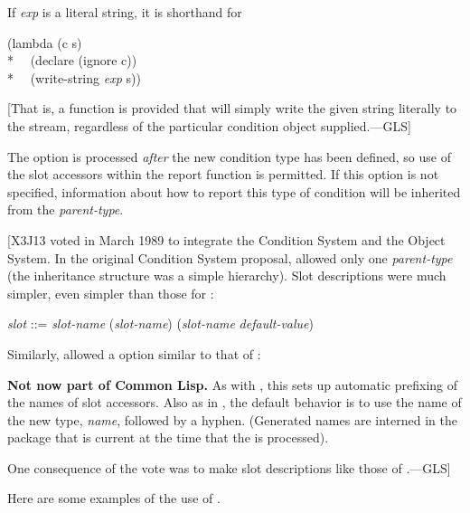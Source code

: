 \begin{defmac}
\begin{flushdesc}
  If \emph{exp} is a literal string, it is shorthand for
  \begin{lisp}
    (lambda (c s) \\*
    ~~(declare (ignore c)) \\*
    ~~(write-string \emph{exp} s))
  \end{lisp}
  [That is, a function is provided that will simply write the given
  string literally to the stream, regardless of the particular condition object
  supplied.---GLS]

  The  option is processed \emph{after} the new condition type has
  been defined, so use of the slot accessors within the report function is
  permitted.  If this option is not specified, information about how to report
  this type of condition will be inherited from the \emph{parent-type}.
\end{flushdesc}

[X3J13 voted in March 1989  to integrate the
Condition System and the Object System.
In the original Condition System proposal, 
allowed only one \emph{parent-type} (the inheritance structure was a simple
hierarchy).
Slot descriptions were much simpler, even simpler than those for :
\begin{tabbing}
\emph{slot} ::= \emph{slot-name} {\Mor} (\emph{slot-name}) {\Mor} (\emph{slot-name} \emph{default-value})
\end{tabbing}
Similarly,  allowed
a  option similar to that of :
\begin{flushdesc}
\item[\cd{(:conc-name \emph{symbol-or-string})}]

     \textbf{Not now part of Common Lisp.}
     As with , this sets up automatic prefixing of the names 
     of slot accessors. Also as in , the default behavior 
     is to use the name of the new type, \emph{name}, followed by a hyphen.
     (Generated names are interned in the package that is current at the time that the 
      is processed).
\end{flushdesc}
One consequence of the vote was to make  slot descriptions
like those of .---GLS]

Here are some examples of the use of .


\end{defmac}
